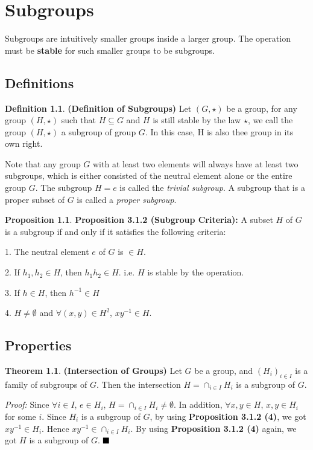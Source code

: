 \documentclass[12pt,openany]{book}
\theoremstyle{definition}
\newtheorem{defi}{Definition}[section]
\newtheorem{theorem}{Theorem}[section]
\newtheorem{proposition}{Proposition}[section]
\theoremstyle{definition}
\begin{document}
\noindent\textbf{}

\chapter{Subgroups}

Subgroups are intuitively smaller groups inside a larger group. The operation must be \textbf{stable} for such smaller groups to be subgroups.

\section{Definitions}

\begin{defi}
\noindent\textbf{(Definition of Subgroups)} Let $(G, \star)$ be a group, for any group $(H, \star)$ such that $H \subseteq G$ and $H$ is still stable by the law $\star$, we call the group $(H, \star)$ a subgroup of group $G$. In this case, H is also thee group in its own right.

\end{defi}
Note that any group $G$ with at least two elements will always have at least two subgroups, which is either consisted of the neutral element alone or the entire group $G$. The subgroup $H={e}$ is called the \textit{trivial subgroup}. A subgroup that is a proper subset of $G$ is called a \textit{proper subgroup}.

\begin{proposition}
\noindent\textbf{Proposition 3.1.2 (Subgroup Criteria):} A subset $H$ of $G$ is a subgroup if and only if it satisfies the following criteria:

1. The neutral element $e$ of $G$ is $\in H$.

2. If $h_1, h_2 \in H$, then $h_1h_2 \in H$. i.e. $H$ is stable by the operation.

3. If $h \in H$, then $h^{-1} \in H$

4. $H \neq \emptyset$ and $\forall(x,y)\in H^{2}$, $xy^{-1} \in H$.
\end{proposition}

\section{Properties}

\begin{theorem}
\noindent\textbf{(Intersection of Groups)} Let $G$ be a group, and $(H_{i})_{i \in I}$ is a family of subgroups of $G$. Then the intersection $H = \cap_{i \in I}H_{i}$ is a subgroup of $G$.
\end{theorem}
\textit{Proof:} Since $\forall i \in I$, $e \in H_{i}$, $H=\cap_{i \in I}H_{i} \neq \emptyset$. In addition, $\forall x,y \in H$, $x,y \in H_{i}$ for some $i$. Since $H_{i}$ is a subgroup of $G$, by using \textbf{Proposition 3.1.2 (4)}, we got $xy^{-1} \in H_{i}$. Hence $xy^{-1} \in \cap_{i \in I}H_{i}$. By using \textbf{Proposition 3.1.2 (4)} again, we got $H$ is a subgroup of $G$. $\hfill\blacksquare$
\end{document}
